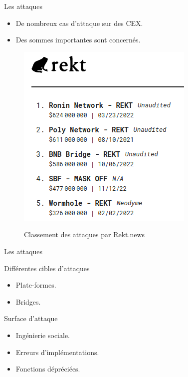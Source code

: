 \begin{frame}{Les attaques}
    \begin{itemize}
        \item De nombreux cas d'attaque sur des CEX.
        \item Des sommes importantes sont concernés.
    \end{itemize}
    \begin{figure}
        \centering
        \includegraphics[scale = 0.45]{centralisation/img_attaques/rekt.png}
        \label{fig:rekt}
        \caption{Classement des attaques par Rekt.news}
    \end{figure}
\end{frame}

\begin{frame}{Les attaques}
    \begin{block}{Différentes cibles d'attaques}
        \begin{itemize}
            \item Plate-formes.
            \item Bridges.
        \end{itemize}
    \end{block}
    \pause
    \begin{block}{Surface d'attaque}
        \begin{itemize}
            \item Ingénierie sociale.
            \item Erreurs d'implémentations.
            \item Fonctions dépréciées.
        \end{itemize}
    \end{block}
\end{frame}

